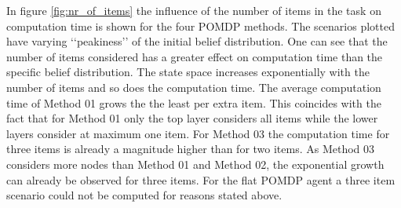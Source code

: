 In figure \ref{fig:nr_of_items} the influence of the number of items in the task on computation time is shown for the four POMDP methods. The scenarios plotted have varying ‘‘peakiness’’ of the initial belief distribution. One can see that the number of items considered has a greater effect on computation time than the specific belief distribution. The state space increases exponentially with the number of items and so does the computation time. The average computation time of Method 01 grows the the least per extra item. This coincides with the fact that for Method 01 only the top layer considers all items while the lower layers consider at maximum one item. For Method 03 the computation time for three items is already a magnitude higher than for two items. As Method 03 considers more nodes than Method 01 and Method 02, the exponential growth can already be observed for three items. For the flat POMDP agent a three item scenario could not be computed for reasons stated above.
